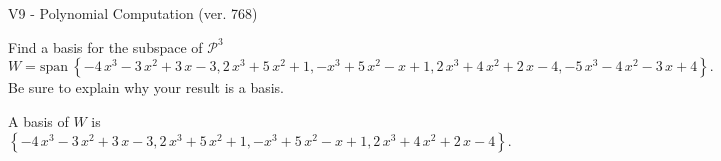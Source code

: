 \begin{exercise}
  \begin{exerciseTitle}V9 - Polynomial Computation (ver. 768)\end{exerciseTitle}
  \begin{exerciseStatement}
    Find a basis for the subspace of \(\mathcal{P}^3\) 
\[W=\mathrm{span}\ \left\{-4 \, x^{3} - 3 \, x^{2} + 3 \, x - 3 , 2 \, x^{3} + 5 \, x^{2} + 1 , -x^{3} + 5 \, x^{2} - x + 1 , 2 \, x^{3} + 4 \, x^{2} + 2 \, x - 4 , -5 \, x^{3} - 4 \, x^{2} - 3 \, x + 4\right\}.\]
 Be sure to explain why your result is a basis.


  \end{exerciseStatement}
  \begin{exerciseAnswer}
   A basis of \(W\) is  \(\left\{-4 \, x^{3} - 3 \, x^{2} + 3 \, x - 3 , 2 \, x^{3} + 5 \, x^{2} + 1 , -x^{3} + 5 \, x^{2} - x + 1 , 2 \, x^{3} + 4 \, x^{2} + 2 \, x - 4\right\}\).
  


  \end{exerciseAnswer}
\end{exercise}